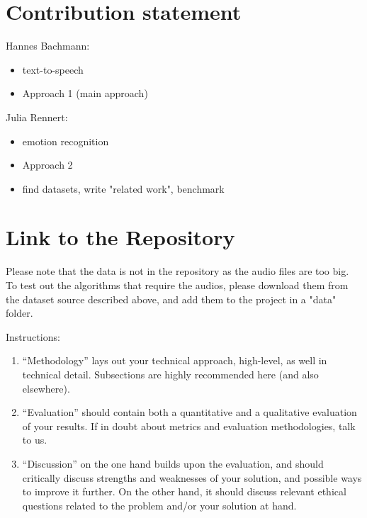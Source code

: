\documentclass[11pt]{article}
\begin{document}
\section{Contribution statement}
Hannes Bachmann:
\begin{itemize}
\item text-to-speech
\item Approach 1 (main approach)
\end{itemize}
Julia Rennert:
\begin{itemize}
\item emotion recognition
\item Approach 2
\item find datasets, write "related work", benchmark
\end{itemize}

\section{Link to the Repository}

Please note that the data is not in the repository as the audio files are too big. To test out the algorithms that require the audios, please download them from the dataset source described above, and add them to the project in a "data" folder.

% 

%

Instructions: 
\begin{enumerate}


    \item ``Methodology'' lays out your technical approach, high-level, as well in technical detail. Subsections are highly recommended here (and also elsewhere).
    \item ``Evaluation'' should contain both a quantitative and a qualitative evaluation of your results. If in doubt about metrics and evaluation methodologies, talk to us.
    \item ``Discussion'' on the one hand builds upon the evaluation, and should critically discuss strengths and weaknesses of your solution, and possible ways to improve it further. On the other hand, it should discuss relevant ethical questions related to the problem and/or your solution at hand.
\end{enumerate}
\end{document}
